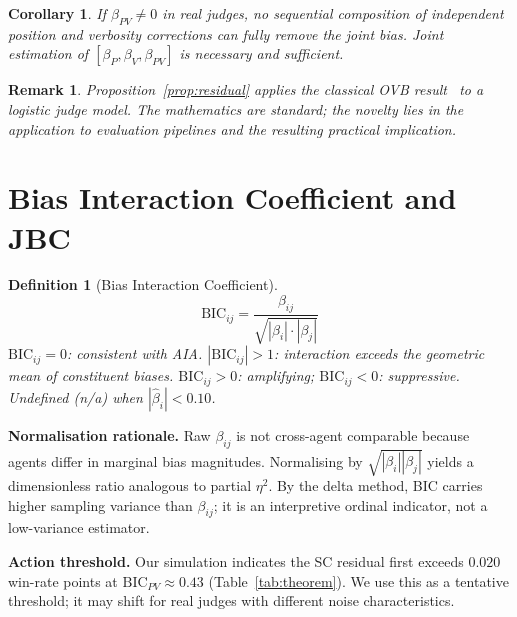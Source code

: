 \documentclass[10pt,conference]{IEEEtran}
\newtheorem{definition}{Definition}
\newtheorem{corollary}{Corollary}
\newtheorem{remark}{Remark}
\newcommand{\BIC}{\mathrm{BIC}}
\begin{document}
\begin{corollary}
\label{cor:composite}
If $\beta_{PV}{\neq}0$ in real judges, no sequential
composition of independent position and verbosity corrections
can fully remove the joint bias.
Joint estimation of $[\beta_P,\beta_V,\beta_{PV}]$ is
necessary and sufficient.
\end{corollary}

\begin{remark}
Proposition~\ref{prop:residual} applies the classical
OVB result~\cite{angrist2009} to a logistic judge model.
The mathematics are standard; the novelty lies in the
application to evaluation pipelines and the
resulting practical implication.
\end{remark}

\section{Bias Interaction Coefficient and JBC}
\label{sec:method}

\begin{definition}[Bias Interaction Coefficient]
\label{def:bic}
\begin{equation}
  \BIC_{ij} =
    \frac{\beta_{ij}}{\sqrt{|\beta_i|\cdot|\beta_j|}}
  \label{eq:bic}
\end{equation}
$\BIC_{ij}{=}0$: consistent with AIA.
$|\BIC_{ij}|{>}1$: interaction exceeds the geometric mean
of constituent biases.
$\BIC_{ij}{>}0$: amplifying; $\BIC_{ij}{<}0$: suppressive.
Undefined (n/a) when $|\hat\beta_i|{<}0.10$.
\end{definition}

\textbf{Normalisation rationale.}
Raw $\beta_{ij}$ is not cross-agent comparable because
agents differ in marginal bias magnitudes.
Normalising by $\sqrt{|\beta_i||\beta_j|}$ yields a
dimensionless ratio analogous to partial $\eta^2$.
By the delta method, BIC carries higher sampling variance
than $\beta_{ij}$; it is an interpretive ordinal indicator,
not a low-variance estimator.

\textbf{Action threshold.}
Our simulation indicates the SC residual first exceeds
$0.020$ win-rate points at $\BIC_{PV}{\approx}0.43$
(Table~\ref{tab:theorem}).
We use this as a tentative threshold; it may shift for
real judges with different noise characteristics.
\end{document}
